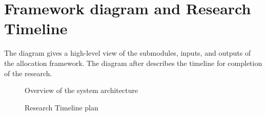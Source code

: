 \section{Framework diagram and Research Timeline}

The diagram gives a high-level view of the submodules, inputs, and outputs of the allocation framework. The diagram after describes the timeline for completion of the research.

\begin{figure}
	\centering
    \caption{Overview of the system architecture}
    \label{fig:system_architecture}
\end{figure}

\begin{figure}
    \centering
    \caption{Research Timeline plan}
    \label{fig:gantt_chart}
\end{figure}
